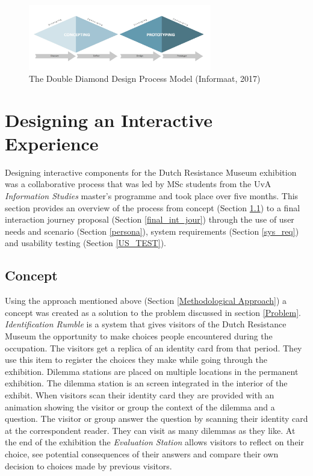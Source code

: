 \begin{figure} [H]
\includegraphics[width=8cm]{assets/diamond.jpg}
\caption{The Double Diamond Design Process Model (Informaat, 2017)}
\centering
\label{Diamond}
\end{figure}

\newpage
\section{Designing an Interactive Experience} \label{intexper}

Designing interactive components for the Dutch Resistance Museum exhibition was a collaborative process that was led by MSc students from the UvA \textit{Information Studies} master's programme and took place over five months. This section provides an overview of the process from concept (Section \ref{concept}) to a final interaction journey proposal (Section \ref{final_int_jour}) through the use of user needs and scenario (Section \ref{persona}), system requirements (Section \ref{sys_req}) and usability testing (Section \ref{US_TEST}).


\subsection{Concept} \label{concept}
Using the approach mentioned above (Section \ref{Methodological Approach}) a concept was created as a solution to the problem discussed in section \ref{Problem}. \textit{Identification Rumble} is a system that gives visitors of the Dutch Resistance Museum the opportunity to make choices people encountered during the occupation. The visitors get a replica of an identity card from that period. They use this item to register the choices they make while going through the exhibition. Dilemma stations are placed on multiple locations in the permanent exhibition. The dilemma station is an screen integrated in the interior of the exhibit. When visitors scan their identity card they are provided with an animation showing the visitor or group the context of the dilemma and a question. The visitor or group answer the question by scanning their identity card at the correspondent reader. They can visit as many dilemmas as they like. At the end of the exhibition the \textit{Evaluation Station} allows visitors to reflect on their choice, see potential consequences of their answers and compare their own decision to choices made by previous visitors.

